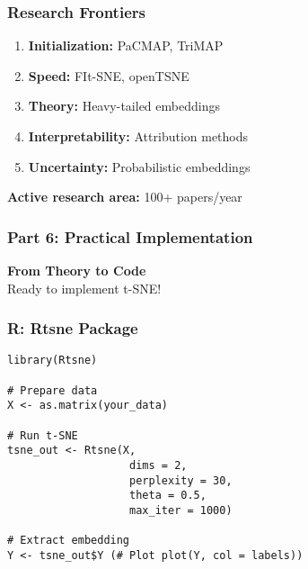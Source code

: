 \documentclass[aspectratio=169]{beamer}
\begin{document}
\begin{frame}
\frametitle{Research Frontiers}

\begin{enumerate}
\item \textbf{Initialization:} PaCMAP, TriMAP
\item \textbf{Speed:} FIt-SNE, openTSNE
\item \textbf{Theory:} Heavy-tailed embeddings
\item \textbf{Interpretability:} Attribution methods
\item \textbf{Uncertainty:} Probabilistic embeddings
\end{enumerate}

\vspace{0.3cm}
\textbf{Active research area:} 100+ papers/year

\end{frame}

\begin{frame}
\frametitle{Part 6: Practical Implementation}

\begin{center}
\LARGE{\textbf{From Theory to Code}}\\[1cm]

Ready to implement t-SNE!
\end{center}

\end{frame}


\begin{frame}[fragile]
\frametitle{R: Rtsne Package}

\begin{verbatim}
library(Rtsne)

# Prepare data
X <- as.matrix(your_data)

# Run t-SNE
tsne_out <- Rtsne(X,
                   dims = 2,
                   perplexity = 30,
                   theta = 0.5,
                   max_iter = 1000)

# Extract embedding
Y <- tsne_out$Y (# Plot plot(Y, col = labels))
\end{verbatim}

\end{frame}
\end{document}
